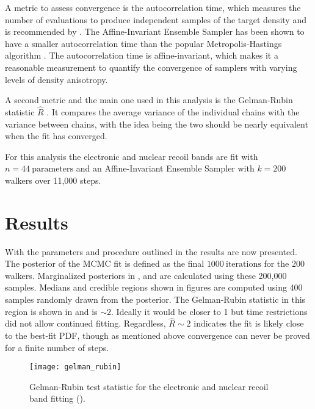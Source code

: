 A metric to assess convergence is the autocorrelation time, which measures the number
of evaluations to produce independent samples of the target density and is recommended by .  The Affine-Invariant
Ensemble Sampler has been shown to have a smaller autocorrelation time than the popular Metropolis-Hastings algorithm
.  The autocorrelation time is affine-invariant, which makes it a reasonable measurement to quantify
the convergence of samplers with varying levels of density anisotropy.

A second metric and the main one used in
this analysis is the Gelman-Rubin statistic $\hat{R}$ .  It compares the average variance of the individual chains
with the variance between chains, with the idea being the two should be nearly equivalent when the fit has converged.

For this analysis the electronic and nuclear recoil bands are fit with  $n = 44\ \mathrm{parameters}$ and an Affine-Invariant Ensemble
Sampler with $k = 200$ walkers over 11,000 steps.



\section{Results}
\label{sec:er_nr_calibrations_results}
With the parameters and procedure outlined in  the results are now
presented.  The posterior of the MCMC fit is defined as the final $1000\ \mathrm{iterations}$ for the 200 walkers.  Marginalized
posteriors in ,  and
 are calculated using these 200,000 samples.  Medians and credible regions shown in
figures are computed using 400 samples randomly drawn from the posterior.  The Gelman-Rubin statistic in this region is
shown in  and is ${\sim}2$.  Ideally it would be closer to 1 but time restrictions did not allow
continued fitting.  Regardless, $\hat{R} \sim 2$ indicates the fit is likely close to the best-fit PDF, though as mentioned above
convergence can never be proved for a finite number of steps.

\begin{figure}
\centering
\texttt{[image: gelman\_rubin]}
\caption{Gelman-Rubin test statistic for the electronic and nuclear recoil band fitting
().}
\label{fig:er_nr_calibrations_results_gr}
\end{figure}




